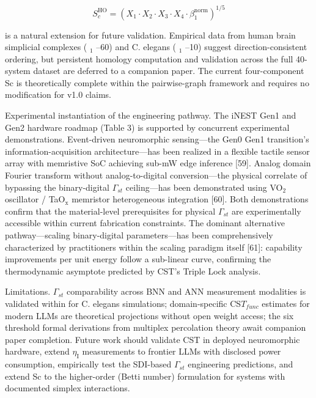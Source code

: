 \documentclass[a4paper,12pt]{article}
\providecommand{\textsubscript}[1]{\ensuremath{_{\text{#1}}}}
\begin{document}
\begin{equation}
S_c^{\text{HO}} = (X_1 \cdot X_2 \cdot X_3 \cdot X_4 \cdot \beta_1^{\text{norm}})^{1/5}
\end{equation}

is a natural extension for future validation. Empirical data from human brain simplicial complexes ( \beta \textsubscript{1}  --60) and C. elegans ( \beta \textsubscript{1}  --10) suggest direction-consistent ordering, but persistent homology computation and validation across the full 40-system dataset are deferred to a companion paper. The current four-component Sc is theoretically complete within the pairwise-graph framework and requires no modification for v1.0 claims.

Experimental instantiation of the engineering pathway.
The iNEST Gen1 and Gen2 hardware roadmap (Table 3) is supported by concurrent experimental demonstrations.
Event-driven neuromorphic sensing---the Gen0 \rightarrow Gen1 transition's information-acquisition architecture---has been realized in a flexible tactile sensor array with memristive SoC achieving sub-mW edge inference [59].
Analog domain Fourier transform without analog-to-digital conversion---the physical correlate of bypassing the binary-digital $\Gamma_{st}$ ceiling---has been demonstrated using VO\textsubscript{2} oscillator / TaO\textsubscript{x} memristor heterogeneous integration [60].
Both demonstrations confirm that the material-level prerequisites for physical $\Gamma_{st}$ are experimentally accessible within current fabrication constraints.
The dominant alternative pathway---scaling binary-digital parameters---has been comprehensively characterized by practitioners within the scaling paradigm itself [61]: capability improvements per unit energy follow a sub-linear curve, confirming the thermodynamic asymptote predicted by CST's Triple Lock analysis.

Limitations. $\Gamma_{st}$ comparability across BNN and ANN measurement modalities is validated within   for C. elegans simulations; domain-specific CS$T_{func}$ estimates for modern LLMs are theoretical projections without open weight access; the six threshold formal derivations from multiplex percolation theory await companion paper completion.
Future work should validate CST in deployed neuromorphic hardware, extend $\eta_{\text{I}}$ measurements to frontier LLMs with disclosed power consumption, empirically test the SDI-based $\Gamma_{st}$ engineering predictions, and extend Sc to the higher-order (Betti number) formulation for systems with documented simplex interactions.
\end{document}
